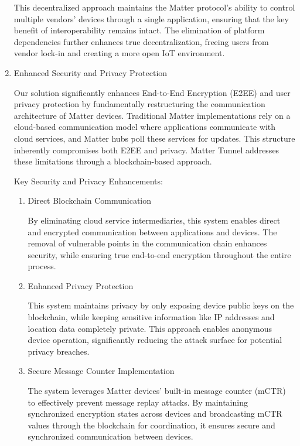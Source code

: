 \documentclass[conference]{IEEEtran}
\begin{document}
\begin{enumerate}[itemsep=2ex, parsep=1ex]
	      This decentralized approach maintains the Matter protocol's ability to control multiple vendors' devices through a single application, ensuring that the key benefit of interoperability remains intact. The elimination of platform dependencies further enhances true decentralization, freeing users from vendor lock-in and creating a more open IoT environment.
	      
	\item Enhanced Security and Privacy Protection
	      
	      Our solution significantly enhances End-to-End Encryption (E2EE) and user privacy protection by fundamentally restructuring the communication architecture of Matter devices. Traditional Matter implementations rely on a cloud-based communication model where applications communicate with cloud services, and Matter hubs poll these services for updates. This structure inherently compromises both E2EE and privacy. Matter Tunnel addresses these limitations through a blockchain-based approach.
	      
	      Key Security and Privacy Enhancements:
	      
	      \begin{enumerate}[itemsep=2ex, parsep=1ex]
	      	\item Direct Blockchain Communication
	      	      
	      	      By eliminating cloud service intermediaries, this system enables direct and encrypted communication between applications and devices. The removal of vulnerable points in the communication chain enhances security, while ensuring true end-to-end encryption throughout the entire process.
	      	      
	      	\item Enhanced Privacy Protection
	      	      
	      	      This system maintains privacy by only exposing device public keys on the blockchain, while keeping sensitive information like IP addresses and location data completely private. This approach enables anonymous device operation, significantly reducing the attack surface for potential privacy breaches.
	      	      
	      	\item Secure Message Counter Implementation
	      	      
	      	      The system leverages Matter devices' built-in message counter (mCTR) to effectively prevent message replay attacks. By maintaining synchronized encryption states across devices and broadcasting mCTR values through the blockchain for coordination, it ensures secure and synchronized communication between devices.
	      	      

\end{enumerate}
\end{enumerate}
\end{document}
